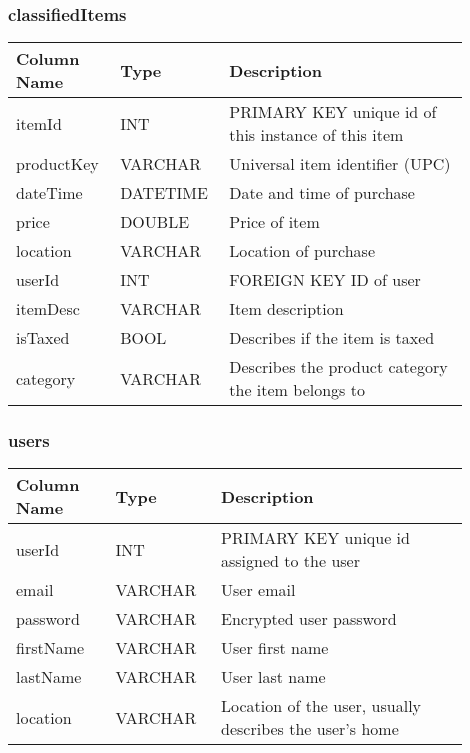 \documentclass[12pt, titlepage]{article}
\begin{document}
\subsubsection{classifiedItems}
\begin{table}[H]
  \begin{tabular}{|p{0.2\linewidth}|p{0.2\linewidth}|p{0.5\linewidth}|}
    \hline
    \textbf{Column Name} & \textbf{Type} & \textbf{Description} \\
    \hline
    itemId & INT & PRIMARY KEY unique id of this instance of this item \\
    \hline
    productKey & VARCHAR & Universal item identifier (UPC) \\
    \hline
    dateTime & DATETIME & Date and time of purchase \\
    \hline
    price & DOUBLE & Price of item \\
    \hline
    location & VARCHAR & Location of purchase \\
    \hline
    userId & INT & FOREIGN KEY ID of user\\
    \hline
    itemDesc & VARCHAR & Item description\\
    \hline
    isTaxed & BOOL & Describes if the item is taxed\\
    \hline
    category & VARCHAR & Describes the product category the item belongs to\\
    \hline
  \end{tabular}
\end{table}

\subsubsection{users}
\begin{table}[H]
  \begin{tabular}{|p{0.2\linewidth}|p{0.2\linewidth}|p{0.5\linewidth}|}
    \hline
    \textbf{Column Name} & \textbf{Type} & \textbf{Description} \\
    \hline
    userId & INT & PRIMARY KEY unique id assigned to the user \\
    \hline
    email & VARCHAR & User email \\
    \hline
    password & VARCHAR & Encrypted user password \\
    \hline
    firstName & VARCHAR & User first name \\
    \hline
    lastName & VARCHAR & User last name \\
    \hline
    location & VARCHAR & Location of the user, usually describes the user's home\\
    \hline
  \end{tabular}
\end{table}
\end{document}
